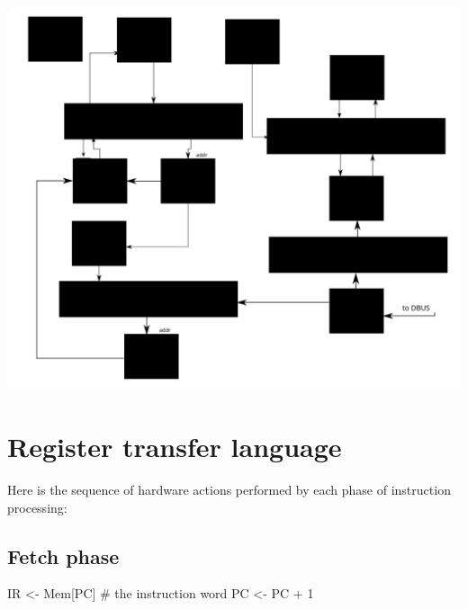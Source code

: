 \documentclass[12pt]{article}
\begin{document}
\includegraphics[width=\textwidth]{controlpath}

\vspace{112pt}
\section{Register transfer language}
Here is the sequence of hardware actions performed by each phase of instruction processing:

\subsection{Fetch phase}
\begin{verbatimtab}
IR <- Mem[PC] # the instruction word
PC <- PC + 1
\end{verbatimtab}
\end{document}

